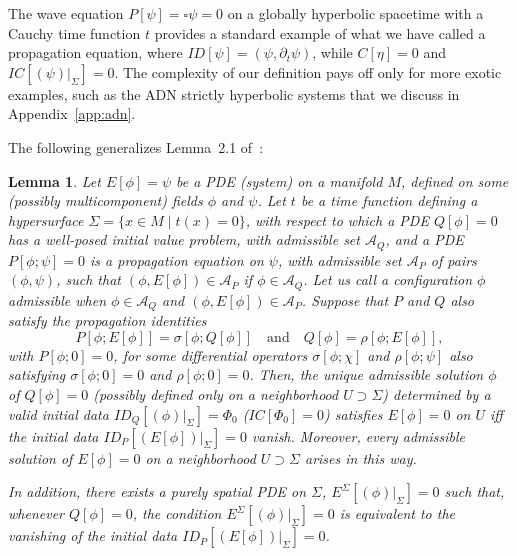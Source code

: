 \documentclass[a4paper]{article}
\newtheorem{lem}[thm]{Lemma}
\theoremstyle{remark}
\newcommand{\del}{\partial}
\begin{document}
The wave equation $P[\psi] = \square \psi = 0$ on a globally hyperbolic
spacetime with a Cauchy time function $t$ provides a standard example of
what we have called a propagation equation, where $ID[\psi] = (\psi,
\del_t \psi)$, while $C[\eta] = 0$ and $IC[(\psi)|_\Sigma] = 0$. The
complexity of our definition pays off only for more exotic examples,
such as the ADN strictly hyperbolic systems that we discuss in
Appendix~\ref{app:adn}.

The following generalizes Lemma~2.1 of~\cite{khgp-ckid}:
\begin{lem} \label{lem:propeq}
Let $E[\phi] = \psi$ be a PDE (system) on a manifold $M$, defined on
some (possibly multicomponent) fields $\phi$ and $\psi$. Let $t$ be a
time function defining a hypersurface $\Sigma = \{ x\in M \mid t(x) =
0 \}$, with respect to which a PDE $Q[\phi] = 0$ has a well-posed
initial value problem, with admissible set $\mathcal{A}_Q$, and a PDE
$P[\phi;\psi] = 0$ is a propagation equation on $\psi$, with admissible
set $\mathcal{A}_P$ of pairs $(\phi,\psi)$, such that $(\phi,E[\phi]) \in \mathcal{A}_P$ if $\phi \in \mathcal{A}_Q$. Let us call a configuration
$\phi$ \emph{admissible} when $\phi \in \mathcal{A}_Q$ and $(\phi,
E[\phi]) \in \mathcal{A}_P$. Suppose that $P$ and $Q$ also satisfy the
\emph{propagation identities}
\begin{equation} \label{eq:propeq}
	P[\phi; E[\phi]] = \sigma[\phi; Q[\phi]]
	\quad \text{and} \quad
	Q[\phi] = \rho[\phi; E[\phi]] ,
\end{equation}
with $P[\phi;0] = 0$, for some differential operators
$\sigma[\phi;\chi]$ and $\rho[\phi;\psi]$ also satisfying
$\sigma[\phi;0] = 0$ and $\rho[\phi;0] = 0$. Then, the unique admissible
solution $\phi$ of $Q[\phi] = 0$ (possibly defined only on a
neighborhood $U \supset \Sigma$) determined by a valid
initial data $ID_Q[(\phi)|_\Sigma] = \Phi_0$ ($IC[\Phi_0] = 0$)
satisfies $E[\phi] = 0$ on $U$ iff the initial data
$ID_P[(E[\phi])|_\Sigma] = 0$ vanish. Moreover, every admissible
solution of $E[\phi] = 0$ on a neighborhood $U \supset \Sigma$ arises in
this way.

In addition, there exists a purely spatial PDE on $\Sigma$,
$E^\Sigma[(\phi)|_\Sigma] = 0$ such that, whenever $Q[\phi] = 0$, the
condition $E^\Sigma[(\phi)|_\Sigma] = 0$ is equivalent to the vanishing
of the initial data $ID_P[(E[\phi])|_\Sigma] = 0$.
\end{lem}
\end{document}
